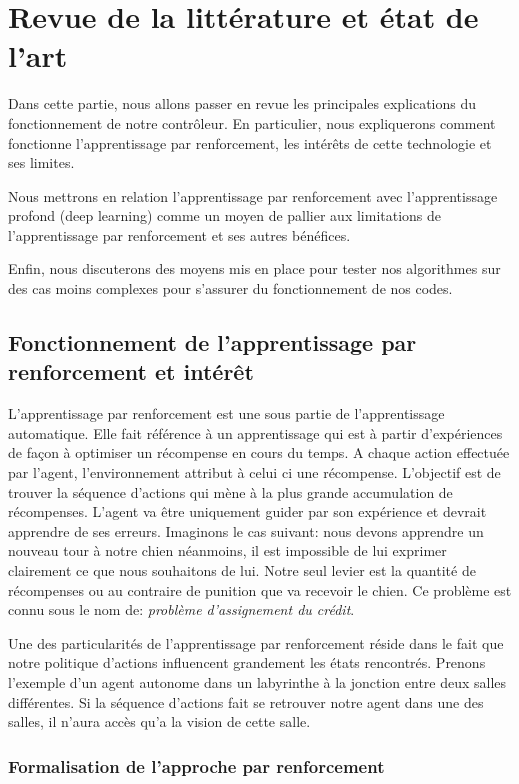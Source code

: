 \newpage
\section{Revue de la littérature et état de l'art}

Dans cette partie, nous allons passer en revue les principales explications du fonctionnement de notre contrôleur. 
En particulier, nous expliquerons comment fonctionne l'apprentissage par renforcement, les intérêts de cette technologie et ses limites.  

Nous mettrons en relation l'apprentissage par renforcement avec l'apprentissage profond (deep learning) comme un moyen de pallier aux limitations de l'apprentissage par renforcement et ses autres bénéfices.

Enfin, nous discuterons des moyens mis en place pour tester nos algorithmes sur des cas moins complexes pour s'assurer du fonctionnement de nos codes.

\subsection{Fonctionnement de l'apprentissage par renforcement et intérêt}

L'apprentissage par renforcement est une sous partie de l'apprentissage automatique. Elle fait référence à un apprentissage qui est à partir d'expériences de façon à optimiser un récompense en cours du temps. A chaque action effectuée par l'agent, l'environnement attribut à celui ci une récompense. L'objectif est de trouver la séquence d'actions qui mène à la plus grande accumulation de récompenses. L'agent va être uniquement guider par son expérience et devrait apprendre de ses erreurs. Imaginons le cas suivant: nous devons apprendre un nouveau tour à notre chien néanmoins, il est impossible de lui exprimer clairement ce que nous souhaitons de lui. Notre seul levier est la quantité de récompenses ou au contraire de punition que va recevoir le chien. Ce problème est connu sous le nom de: \emph{problème d'assignement du crédit}. 

Une des particularités de l'apprentissage par renforcement réside dans le fait que notre politique d'actions influencent grandement les états rencontrés. Prenons l'exemple d'un agent autonome dans un labyrinthe à la jonction entre deux salles différentes. Si la séquence d'actions fait se retrouver notre agent dans une des salles, il n'aura accès qu'a la vision de cette salle.

\subsubsection{Formalisation de l'approche par renforcement}

